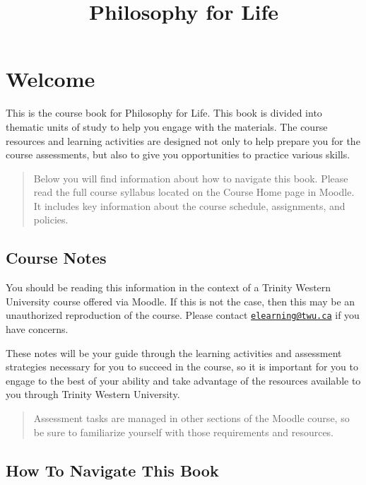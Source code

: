 \documentclass[
]{book}
\title{Philosophy for Life}
\author{}
\date{\vspace{-2.5em}}
\begin{document}
\maketitle

{
\setcounter{tocdepth}{1}
\tableofcontents
}
\hypertarget{welcome}{%
\chapter*{Welcome}\label{welcome}}

This is the course book for Philosophy for Life. This book is divided into thematic units of study to help you engage with the materials. The course resources and learning activities are designed not only to help prepare you for the course assessments, but also to give you opportunities to practice various skills.

\begin{quote}
Below you will find information about how to navigate this book. Please read the full course syllabus located on the Course Home page in Moodle. It includes key information about the course schedule, assignments, and policies.
\end{quote}

\hypertarget{course-notes}{%
\section*{Course Notes}\label{course-notes}}

You should be reading this information in the context of a Trinity Western University course offered via Moodle. If this is not the case, then this may be an unauthorized reproduction of the course. Please contact \href{mailto:elearning@twu.ca}{\nolinkurl{elearning@twu.ca}} if you have concerns.

These notes will be your guide through the learning activities and assessment strategies necessary for you to succeed in the course, so it is important for you to engage to the best of your ability and take advantage of the resources available to you through Trinity Western University.

\begin{quote}
Assessment tasks are managed in other sections of the Moodle course, so be sure to familiarize yourself with those requirements and resources.
\end{quote}

\hypertarget{how-to-navigate-this-book}{%
\section*{How To Navigate This Book}\label{how-to-navigate-this-book}}
\end{document}
